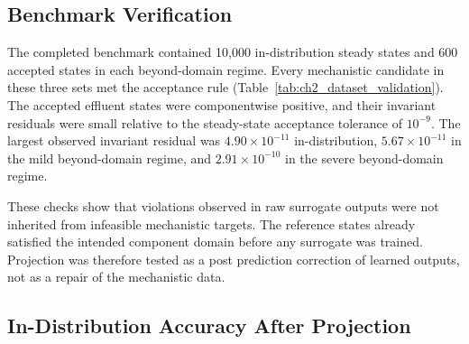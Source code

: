 \documentclass[12pt, twoside]{book}
\begin{document}
\subsection{Benchmark Verification}

The completed benchmark contained 10,000 in-distribution steady states and 600 accepted states in each
beyond-domain regime. Every mechanistic candidate in these three sets met the acceptance rule
(Table~\ref{tab:ch2_dataset_validation}). The accepted effluent states were componentwise positive, and their
invariant residuals were small relative to the steady-state acceptance tolerance of \(10^{-9}\). The largest
observed invariant residual was \(4.90\times10^{-11}\) in-distribution, \(5.67\times10^{-11}\) in the mild
beyond-domain regime, and \(2.91\times10^{-10}\) in the severe beyond-domain regime.

These checks show that violations observed in raw surrogate outputs were not inherited from infeasible
mechanistic targets. The reference states already satisfied the intended component domain before any surrogate
was trained. Projection was therefore tested as a post prediction correction of learned outputs, not as a repair
of the mechanistic data.

\begin{table}[htbp]
\centering
\caption{Mechanistic dataset generation and invariant verification. The invariant residual is \(\|Ac_{out}-Ac_{in}\|_2\).}
\label{tab:ch2_dataset_validation}
\scriptsize
\setlength{\tabcolsep}{5pt}
\end{table}

\subsection{In-Distribution Accuracy After Projection}
\end{document}

